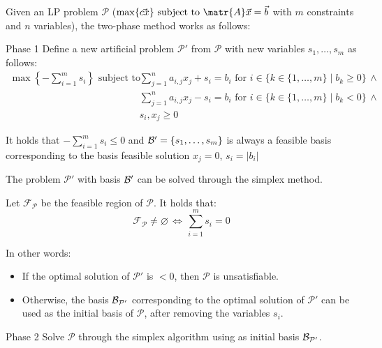 Given an LP problem $\mathcal{P}$ ($\max\{ \vec{cx} \} \text{ subject to } \matr{A}\vec{x} = \vec{b}$ with $m$ constraints and $n$ variables), 
the two-phase method works as follows:
\begin{descriptionlist}
    \item[Phase 1] 
        Define a new artificial problem $\mathcal{P}'$ from $\mathcal{P}$ with new variables $s_1, \dots, s_m$ as follows:
        \[
            \begin{split}
                \max\left\{ -\sum_{i=1}^{m} s_i \right\} \text{ subject to } 
                    &\sum_{j=1}^{n} a_{i,j} x_j + s_i = b_i \text{ for } i \in \{ k \in \{ 1, \dots, m \} \mid b_k \geq 0 \} \,\land \\
                    &\sum_{j=1}^{n} a_{i,j} x_j - s_i = b_i \text{ for } i \in \{ k \in \{ 1, \dots, m \} \mid b_k < 0 \} \,\land \\
                    & s_i, x_j \geq 0
            \end{split}
        \]

        \begin{remark}
            It holds that $-\sum_{i=1}^{m} s_i \leq 0$ and 
            $\mathcal{B}' = \{ s_1, \dots, s_m \}$ is always a feasible basis corresponding to the basis feasible solution $x_j = 0$, $s_i = \vert b_i \vert$
        \end{remark}

        The problem $\mathcal{P}'$ with basis $\mathcal{B}'$ can be solved through the simplex method.

        \begin{theorem}
            Let $\mathcal{F}_\mathcal{P}$ be the feasible region of $\mathcal{P}$. It holds that:
            \[ \mathcal{F}_\mathcal{P} \neq \varnothing \,\iff\, \sum_{i=1}^{m} s_i = 0 \]

            In other words:
            \begin{itemize}
                \item If the optimal solution of $\mathcal{P}'$ is  $< 0$, then $\mathcal{P}$ is unsatisfiable.
                \item Otherwise, the basis $\mathcal{B}_{\mathcal{P}'}$ corresponding to the optimal solution of $\mathcal{P}'$ 
                    can be used as the initial basis of $\mathcal{P}$, after removing the variables $s_i$.
            \end{itemize}
        \end{theorem}

    \item[Phase 2] 
        Solve $\mathcal{P}$ through the simplex algorithm using as initial basis $\mathcal{B}_{\mathcal{P}'}$.
\end{descriptionlist}